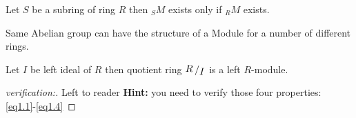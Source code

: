 \begin{remark}
	Let $S$ be a subring of ring $R$ then $_{S}M$ exists   only if $_{R}M$ exists.
\end{remark} \bigskip
\begin{remark}
	Same Abelian group can have the structure of a Module for a number of different rings.
\end{remark} \bigskip
\begin{remark}
Let $I$ be left ideal of $R$ then quotient ring $\bigslant{R}{I}$ is a left $R$-module.

\end{remark}
\begin{proof}[verification:]
	Left to reader\newline \bigskip
	\textbf{Hint:} you need to verify those four properties: \eqref{eq1.1}-\eqref{eq1.4}
\end{proof}
\bigskip

